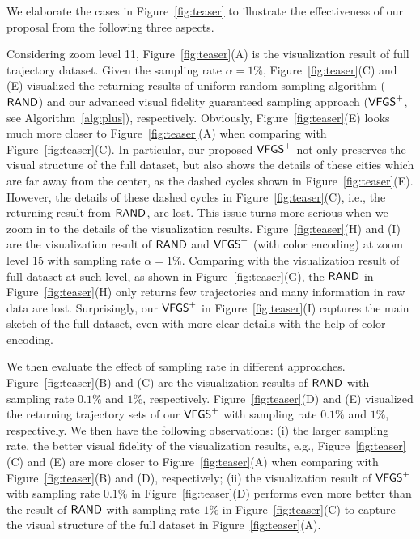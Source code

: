 We elaborate the cases in Figure~\ref{fig:teaser} to illustrate the effectiveness of our proposal from the following three aspects.


Considering zoom level 11, Figure~\ref{fig:teaser}(A) is the visualization result of full \pt{} trajectory dataset.
Given the sampling rate $\alpha = 1\%$, Figure~\ref{fig:teaser}(C) and (E) visualized the returning results of uniform random sampling algorithm ($\mathsf{RAND}$)
and our advanced visual fidelity guaranteed sampling approach ($\mathsf{VFGS}^{+}$, see Algorithm~\ref{alg:plus}), respectively.
Obviously, Figure~\ref{fig:teaser}(E) looks much more closer to Figure~\ref{fig:teaser}(A) when comparing with Figure~\ref{fig:teaser}(C).
In particular, our proposed $\mathsf{VFGS}^{+}$ not only preserves the visual structure of the full dataset,
but also shows the details of these cities which are far away from the center, as the dashed cycles shown in Figure~\ref{fig:teaser}(E).
However, the details of these dashed cycles in Figure~\ref{fig:teaser}(C), i.e., the returning result from $\mathsf{RAND}{}$, are lost.
This issue turns more serious when we zoom in to the details of the visualization results.
Figure~\ref{fig:teaser}(H) and (I) are the visualization result of $\mathsf{RAND}$ and $\mathsf{VFGS}^{+}$  (with color encoding) at zoom level 15 with sampling rate $\alpha=1\%$.
Comparing with the visualization result of full dataset at such level, as shown in Figure~\ref{fig:teaser}(G),
the $\mathsf{RAND}{}$ in Figure~\ref{fig:teaser}(H) only returns few trajectories and many information in raw data are lost.
Surprisingly, our $\mathsf{VFGS}^{+}$ in Figure~\ref{fig:teaser}(I) captures the main sketch of the full dataset, even with more clear details with the help of color encoding.

We then evaluate the effect of sampling rate in different approaches.
Figure~\ref{fig:teaser}(B) and (C) are the visualization results of $\mathsf{RAND}{}$ with sampling rate $0.1\%$ and $1\%$, respectively.
Figure~\ref{fig:teaser}(D) and (E) visualized the returning trajectory sets of our $\mathsf{VFGS}^{+}{}$ with sampling rate $0.1\%$ and $1\%$, respectively.
We then have the following observations:
(i) the larger sampling rate, the better visual fidelity of the visualization results, e.g.,
Figure~\ref{fig:teaser}(C) and (E) are more closer to Figure~\ref{fig:teaser}(A) when comparing with Figure~\ref{fig:teaser}(B) and (D), respectively;
(ii) the visualization result of $\mathsf{VFGS}^{+}$ with sampling rate $0.1\%$ in Figure~\ref{fig:teaser}(D)
performs even more better than the result of $\mathsf{RAND}{}$ with sampling rate $1\%$ in Figure~\ref{fig:teaser}(C) to capture the visual structure of the full dataset in Figure~\ref{fig:teaser}(A).


